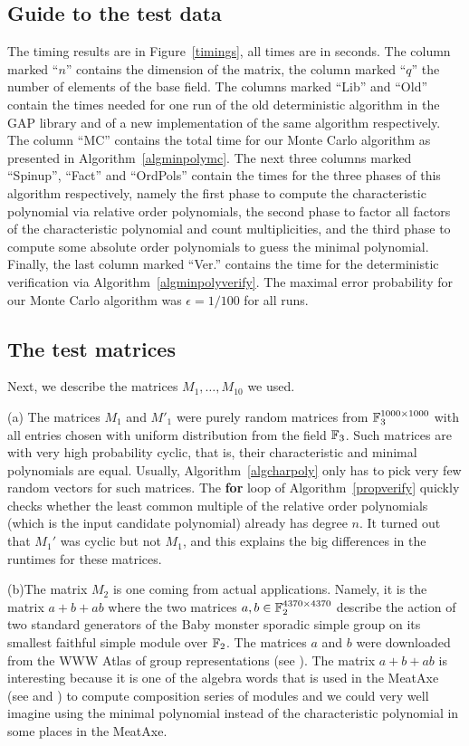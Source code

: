 \subsection{Guide to the test data}
The timing results
are in Figure~\ref{timings}, all times are in seconds. 
The column marked ``$n$'' contains the
dimension of the matrix, the column marked ``$q$'' the number of elements
of the base field. The columns marked ``Lib'' and ``Old'' contain the times
needed for one run of the old deterministic algorithm
in the {\sf GAP} library and of a new implementation of the same algorithm
respectively. The column ``MC'' contains the total time for our 
Monte Carlo algorithm as presented in Algorithm~\ref{algminpolymc}.
The next three columns marked ``Spinup'', ``Fact'' and ``OrdPols''
contain the times for the three phases of this algorithm respectively, 
namely the first phase to compute the characteristic polynomial via
relative order polynomials, the second phase to factor all factors of
the characteristic polynomial and count multiplicities, and the third
phase to compute some absolute order polynomials to guess the minimal
polynomial. Finally, the last column marked ``Ver.'' contains
the time for the deterministic verification via 
Algorithm~\ref{algminpolyverify}.
The maximal error probability for our Monte Carlo algorithm was
$\epsilon = 1/100$ for all runs.

\subsection{The test matrices}
Next, we describe the matrices $M_1, \ldots, M_{10}$ we used.

(a) \quad The matrices $M_1$ and $M'_1$ were purely random matrices from
$\mathbb{F}_3^{1000\times 1000}$ with all entries
chosen with uniform distribution from the field $\mathbb{F}_3$. Such matrices
are with very high probability cyclic, that is, their characteristic and
minimal polynomials are equal. Usually, Algorithm~\ref{algcharpoly} only
has to pick very few random vectors for such matrices. The {\bf for} loop
of Algorithm~\ref{propverify} quickly checks whether the least common multiple
of the relative order polynomials (which is the input candidate polynomial)
already has degree $n$. It turned out that $M_1'$ was cyclic but not $M_1$, 
and this explains the
big differences in the runtimes for these matrices.

(b)\quad The matrix $M_2$ is one coming from actual applications. Namely, it is
the matrix $a+b+ab$ where the two matrices $a,b \in \mathbb{F}_2^{4370 \times
4370}$ describe the action of two standard generators of the Baby monster
sporadic simple group on its smallest faithful simple module over $\mathbb{F}_2$.
The matrices $a$ and $b$ were downloaded from the WWW Atlas of group
representations (see \cite{WWWAtlas}). The matrix $a+b+ab$ is
interesting because it is one of the algebra words that is used
in the {\sc MeatAxe} (see \cite{MeatAxeParker} and \cite{MeatAxeHoltRees})
to compute composition series of modules and
we could very well imagine using the minimal polynomial instead of
the characteristic polynomial in some places in the {\sc MeatAxe}.

